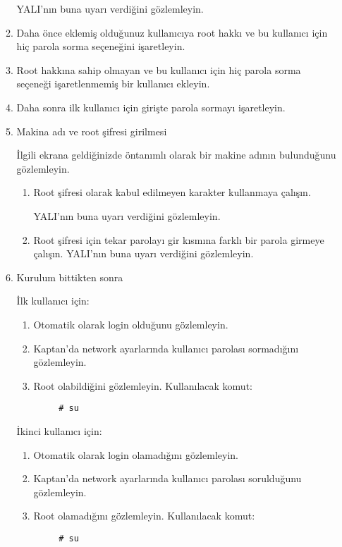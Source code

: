 \documentclass[a4paper,10pt]{article}
\begin{document}
\begin{enumerate}
\begin{enumerate}
	YALI'nın buna uyarı verdiğini gözlemleyin.

\item Daha önce eklemiş olduğunuz kullanıcıya root hakkı ve bu kullanıcı için hiç parola sorma seçeneğini işaretleyin.

\item Root hakkına sahip olmayan ve bu kullanıcı için hiç parola sorma seçeneği işaretlenmemiş bir kullanıcı ekleyin.

\item Daha sonra ilk kullanıcı için girişte parola sormayı işaretleyin.
\item Makina adı ve root şifresi girilmesi
	
	İlgili ekrana geldiğinizde öntanımlı olarak bir makine adının bulunduğunu gözlemleyin.
	\begin{enumerate}
		\item Root şifresi olarak kabul edilmeyen karakter kullanmaya çalışın.

		YALI'nın buna uyarı verdiğini gözlemleyin.
		\item Root şifresi için tekar parolayı gir kısmına farklı bir parola girmeye çalışın.
		YALI'nın buna uyarı verdiğini gözlemleyin.
	\end{enumerate}
\item Kurulum bittikten sonra

	İlk kullanıcı için:
	\begin{enumerate}
	\item Otomatik olarak login olduğunu gözlemleyin.
	\item Kaptan'da network ayarlarında kullanıcı parolası sormadığını gözlemleyin.
	\item Root olabildiğini gözlemleyin.
	Kullanılacak komut:
	\begin{verbatim}
	 # su
	\end{verbatim}
	\end{enumerate}
	İkinci kullanıcı için:
	\begin{enumerate}
	\item Otomatik olarak login olamadığını gözlemleyin.
	\item Kaptan'da network ayarlarında kullanıcı parolası sorulduğunu gözlemleyin.
	\item Root olamadığını gözlemleyin.
	Kullanılacak komut:
	\begin{verbatim}
	 # su
	\end{verbatim}
	\end{enumerate}



\end{enumerate}
\end{enumerate}
\end{document}
